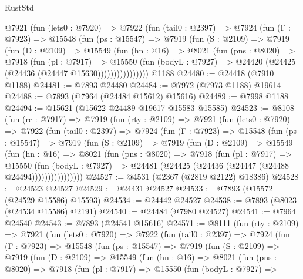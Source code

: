 \begin{lexlean}{RustStd}
\begin{coremodule}
        @7921
          (fun (lets0 : @7920) =>
          @7922
            (fun (tail0 : @2397) =>
            @7924
              (fun (Γ : @7923) =>
              @15548
                (fun (ps : @15547) =>
                @7919
                  (fun (S : @2109) =>
                  @7919
                    (fun (D : @2109) =>
                    @15549
                      (fun (hn : @16) =>
                      @8021
                        (fun (pns : @8020) =>
                        @7918
                          (fun (pl : @7917) =>
                          @15550
                            (fun (bodyL : @7927) =>
                            @24420 (@24425 (@24436 (@24447 @15630))))))))))))))))
    @1188
@24480 := @24418 (@7910 @1188)
@24481 := @7893 @24480
@24484 := @7972 (@7973 @1188) @19614
@24488 := @7893 (@7964 (@24484 @15612) @15616)
@24489 := @7998 @1188
@24494 := @15621 (@15622 @24489 @19617 @15583 @15585)
@24523 := @8108
    (fun (rc : @7917) =>
    @7919
      (fun (rty : @2109) =>
      @7921
        (fun (lets0 : @7920) =>
        @7922
          (fun (tail0 : @2397) =>
          @7924
            (fun (Γ : @7923) =>
            @15548
              (fun (ps : @15547) =>
              @7919
                (fun (S : @2109) =>
                @7919
                  (fun (D : @2109) =>
                  @15549
                    (fun (hn : @16) =>
                    @8021
                      (fun (pns : @8020) =>
                      @7918
                        (fun (pl : @7917) =>
                        @15550
                          (fun (bodyL : @7927) =>
                          @24481 (@24425 (@24436 (@24447 (@24488 @24494))))))))))))))))
@24527 := @4531 (@2367 (@2819 @2122) @18386)
@24528 := @24523 @24527
@24529 := @24431 @24527
@24533 := @7893 (@15572 (@24529 @15586) @15593)
@24534 := @24442 @24527
@24538 := @7893 (@8023 (@24534 @15586) @2191)
@24540 := @24484 (@7980 @24527)
@24541 := @7964 @24540
@24543 := @7893 (@24541 @15616)
@24571 := @8111
    (fun (rty : @2109) =>
    @7921
      (fun (lets0 : @7920) =>
      @7922
        (fun (tail0 : @2397) =>
        @7924
          (fun (Γ : @7923) =>
          @15548
            (fun (ps : @15547) =>
            @7919
              (fun (S : @2109) =>
              @7919
                (fun (D : @2109) =>
                @15549
                  (fun (hn : @16) =>
                  @8021
                    (fun (pns : @8020) =>
                    @7918
                      (fun (pl : @7917) =>
                      @15550
                        (fun (bodyL : @7927) =>

\end{coremodule}
\end{lexlean}
